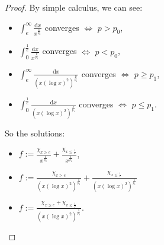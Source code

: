 \documentclass{article}
\newcommand{\dif}{\mathrm{d}}
\begin{document}
\begin{proof}
    By simple calculus, we can see:
    \begin{itemize}
        \item $\int_{e}^{\infty}\frac{\dif x}{x^{\frac{p}{p_{0}}}}$ converges $\Leftrightarrow$ $p>p_0$,
        \item $\int_{0}^{\frac{1}{e}}\frac{\dif x}{x^{\frac{p}{p_{0}}}}$ converges $\Leftrightarrow$ $p<p_0$,
        \item $\int_{e}^{\infty}\frac{\dif x}{\left(x(\log x)^{2}\right)^{\frac{p}{p_{1}}}}$ converges $\Leftrightarrow$ $p\ge p_{1}$,
        \item $\int_{0}^{\frac{1}{e}}\frac{\dif x}{\left(x(\log x)^{2}\right)^{\frac{p}{p_{1}}}}$ converges $\Leftrightarrow$ $p\le p_{1}$.
    \end{itemize}
    So the solutions:
    \begin{itemize}
        \item $f:=\frac{\chi_{x\ge e}}{x^{\frac{1}{p_{0}}}}+\frac{\chi_{x\le\frac{1}{e}}}{x^{\frac{1}{p_1}}}$,
        \item $f:=\frac{\chi_{x\ge e}}{(x(\log x)^{2})^{\frac{1}{p_0}}}+\frac{\chi_{x\le\frac{1}{e}}}{(x(\log x)^{2})^{\frac{1}{p_1}}}$
        \item $f:=\frac{\chi_{x\ge e}+\chi_{x\le\frac{1}{e}}}{(x(\log x)^{2})^{\frac{1}{p_0}}}$.
    \end{itemize}
\end{proof}
\end{document}
